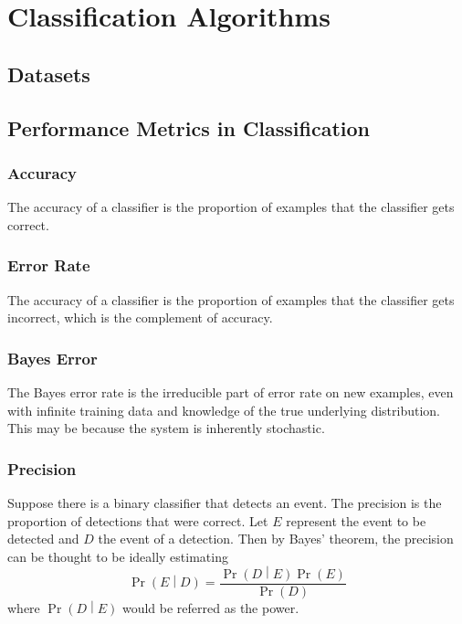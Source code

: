 \documentclass[11pt]{report} %
\begin{document}
\section{Classification Algorithms}

\subsection{Datasets}

\subsection{Performance Metrics in Classification \cite{Goodfellow2016}}

\subsubsection{Accuracy}

The accuracy of a classifier is the proportion of examples that the classifier gets correct.

\subsubsection{Error Rate}

The accuracy of a classifier is the proportion of examples that the classifier gets incorrect, which is the complement of accuracy.

\subsubsection{Bayes Error}

The Bayes error rate is the irreducible part of error rate on new examples, even with infinite training data and knowledge of the true underlying distribution. This may be because the system is inherently stochastic.

\subsubsection{Precision}

Suppose there is a binary classifier that detects an event. The precision is the proportion of detections that were correct. Let $E$ represent the event to be detected and $D$ the event of a detection. Then by Bayes' theorem, the precision can be thought to be ideally estimating
\begin{equation}
\operatorname{Pr}\left(E\middle|D\right) = \dfrac{\operatorname{Pr}\left(D\middle|E\right)\operatorname{Pr}\left(E\right)}{\operatorname{Pr}\left(D\right)}
\end{equation}
where $\operatorname{Pr}\left(D\middle|E\right)$ would be referred as the power.
\end{document}
